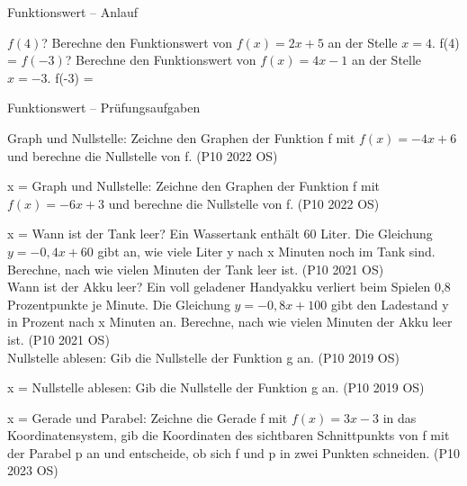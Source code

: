 \begin{aufgabe}{Funktionswert – Anlauf}
\begin{teile}
\teil $f(4)$? Berechne den Funktionswert von $f(x) = 2x + 5$ an der Stelle $x = 4$. f(4) = \leerfeld
\teil $f(-3)$? Berechne den Funktionswert von $f(x) = 4x - 1$ an der Stelle $x = -3$. f(-3) = \leerfeld
\end{teile}
\end{aufgabe}

\begin{aufgabe}{Funktionswert – Prüfungsaufgaben}
\begin{teile}
\teil Graph und Nullstelle: Zeichne den Graphen der Funktion f mit $f(x) = -4x + 6$ und berechne die Nullstelle von f. \hfill (P10 2022 OS) \\

\begin{ksys}[xmin=-4,xmax=4,ymin=-4,ymax=7] \end{ksys}
x = \leerfeld
\teil Graph und Nullstelle: Zeichne den Graphen der Funktion f mit $f(x) = -6x + 3$ und berechne die Nullstelle von f. \hfill (P10 2022 OS) \\

\begin{ksys}[xmin=-4,xmax=4,ymin=-4,ymax=4] \end{ksys}
x = \leerfeld
\teil Wann ist der Tank leer? Ein Wassertank enthält 60 Liter. Die Gleichung $y = -0{,}4x + 60$ gibt an, wie viele Liter y nach x Minuten noch im Tank sind. Berechne, nach wie vielen Minuten der Tank leer ist. \hfill (P10 2021 OS) \\ \leerfeld[min]
\teil Wann ist der Akku leer? Ein voll geladener Handyakku verliert beim Spielen 0{,}8 Prozentpunkte je Minute. Die Gleichung $y = -0{,}8x + 100$ gibt den Ladestand y in Prozent nach x Minuten an. Berechne, nach wie vielen Minuten der Akku leer ist. \hfill (P10 2021 OS) \\ \leerfeld[min]
\teil Nullstelle ablesen: Gib die Nullstelle der Funktion g an. \hfill (P10 2019 OS) \\

\begin{ksys}[xmin=-5,xmax=5,ymin=-5,ymax=5,ablesen]  \end{ksys}
x = \leerfeld
\teil Nullstelle ablesen: Gib die Nullstelle der Funktion g an. \hfill (P10 2019 OS) \\

\begin{ksys}[xmin=-5,xmax=5,ymin=-5,ymax=5,ablesen]  \end{ksys}
x = \leerfeld
\teil Gerade und Parabel: Zeichne die Gerade f mit $f(x) = 3x - 3$ in das Koordinatensystem, gib die Koordinaten des sichtbaren Schnittpunkts von f mit der Parabel p an und entscheide, ob sich f und p in zwei Punkten schneiden. \hfill (P10 2023 OS) \\


\end{teile}
\end{aufgabe}
